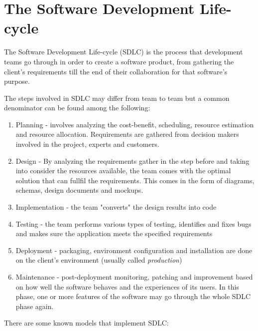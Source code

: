 \section{The Software Development Life-cycle}

\par The Software Development Life-cycle (SDLC) is the process that development teams go through in order to create a software product, from gathering the client's requirements till the end of their collaboration for that software's purpose.

The steps involved in SDLC may differ from team to team but a common denominator can be found among the following:

\begin{enumerate}
    \item Planning - involves analyzing the cost-benefit, scheduling, resource estimation and resource allocation. Requirements are gathered from decision makers involved in the project, experts and customers.
    \item Design - By analyzing the requirements gather in the step before and taking into consider the resources available, the team comes with the optimal solution that can fullfil the requirements. This comes in the form of diagrams, schemas, design documents and mockups.
    \item Implementation - the team "converts" the design results into code
    \item Testing - the team performs various types of testing, identifies and fixes bugs and makes sure the application meets the specified requirements
    \item Deployment - packaging, environment configuration and installation are done on the client's environment (usually called \textit{production})
    \item Maintenance - post-deployment monitoring, patching and improvement based on how well the software behaves and the experiences of its users. In this phase, one or more features of the software may go through the whole SDLC phase again.
\end{enumerate}

\par There are some known models that implement SDLC:

